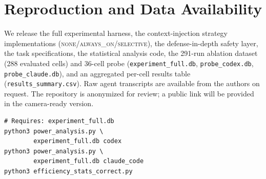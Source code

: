 \documentclass[11pt]{article}
\newcommand{\none}{\textsc{none}}
\newcommand{\alwayson}{\textsc{always\_on}}
\newcommand{\selective}{\textsc{selective}}
\begin{document}
\section{Reproduction and Data Availability}
\label{app:reproduce}

We release the full experimental harness, the context-injection strategy
implementations (\none{}/\alwayson{}/\selective{}), the defense-in-depth safety
layer, the task specifications, the statistical analysis code, the 291-run
ablation dataset (288 evaluated cells) and 36-cell probe (\texttt{experiment\_full.db},
\texttt{probe\_codex.db}, \texttt{probe\_claude.db}), and an aggregated per-cell
results table (\texttt{results\_summary.csv}).
Raw agent transcripts are available from the authors on request.
The repository is anonymized for review; a public link will be provided in the
camera-ready version.

{\footnotesize
\begin{verbatim}
# Requires: experiment_full.db
python3 power_analysis.py \
        experiment_full.db codex
python3 power_analysis.py \
        experiment_full.db claude_code
python3 efficiency_stats_correct.py
\end{verbatim}
}
\end{document}
